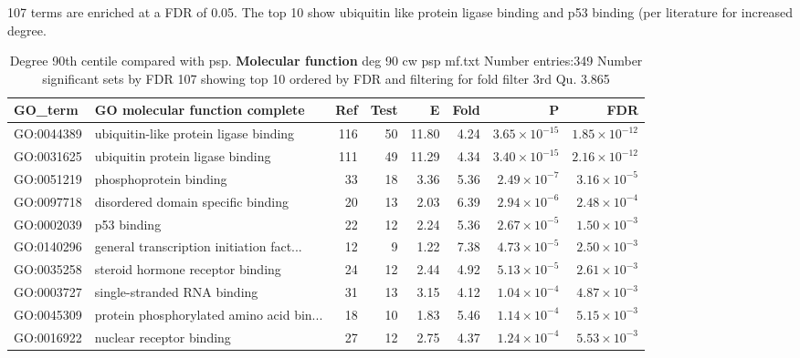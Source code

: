 107 terms are enriched at a FDR of 0.05. The top 10 show ubiquitin like protein ligase binding and p53 binding (per literature for increased degree.
\begin{table}[ht]
\centering
\begin{adjustbox}{width=\textwidth}

\begin{tabular}{llrrrrrr}
  \hline
GO\_term & GO molecular function complete & Ref & Test & E & Fold & P & FDR \\ 
  \hline
GO:0044389 & ubiquitin-like protein ligase binding  & 116 & 50 & 11.80 & 4.24 & $3.65 \times 10^{-15}$ & $1.85 \times 10^{-12}$ \\ 
  GO:0031625 & ubiquitin protein ligase binding  & 111 & 49 & 11.29 & 4.34 & $3.40 \times 10^{-15}$ & $2.16 \times 10^{-12}$ \\ 
  GO:0051219 & phosphoprotein binding  & 33 & 18 & 3.36 & 5.36 & $2.49 \times 10^{-7}$ & $3.16 \times 10^{-5}$ \\ 
  GO:0097718 & disordered domain specific binding  & 20 & 13 & 2.03 & 6.39 & $2.94 \times 10^{-6}$ & $2.48 \times 10^{-4}$ \\ 
  GO:0002039 & p53 binding  & 22 & 12 & 2.24 & 5.36 & $2.67 \times 10^{-5}$ & $1.50 \times 10^{-3}$ \\ 
  GO:0140296 & general transcription initiation fact... & 12 & 9 & 1.22 & 7.38 & $4.73 \times 10^{-5}$ & $2.50 \times 10^{-3}$ \\ 
  GO:0035258 & steroid hormone receptor binding  & 24 & 12 & 2.44 & 4.92 & $5.13 \times 10^{-5}$ & $2.61 \times 10^{-3}$ \\ 
  GO:0003727 & single-stranded RNA binding  & 31 & 13 & 3.15 & 4.12 & $1.04 \times 10^{-4}$ & $4.87 \times 10^{-3}$ \\ 
  GO:0045309 & protein phosphorylated amino acid bin... & 18 & 10 & 1.83 & 5.46 & $1.14 \times 10^{-4}$ & $5.15 \times 10^{-3}$ \\ 
  GO:0016922 & nuclear receptor binding  & 27 & 12 & 2.75 & 4.37 & $1.24 \times 10^{-4}$ & $5.53 \times 10^{-3}$ \\ 
  \hline
\end{tabular}
\end{adjustbox}
\caption{Degree 90th centile compared with psp. \textbf{Molecular function} deg 90 cw psp mf.txt Number entries:349 Number significant sets by FDR 107 showing top 10 ordered by FDR and filtering for fold filter 3rd Qu. 3.865} 
\label{tab:deg 90 cw psp mf.txt Number entries:349 Number significant sets by FDR 107 showing top 10 ordered by FDR and filtering for fold filter 3rd Qu. 3.865}
\end{table}




